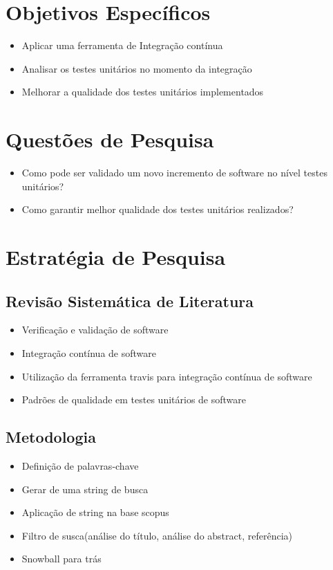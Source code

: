 \section{Objetivos Específicos }
\begin{itemize}
    \item Aplicar uma ferramenta de Integração contínua
    \item Analisar os testes unitários no momento da integração
    \item Melhorar a qualidade dos testes unitários implementados
\end{itemize}
\section{Questões de Pesquisa}
\begin{itemize}
    \item Como pode ser validado um novo incremento de software no nível testes unitários?
    \item Como garantir melhor qualidade dos testes unitários realizados?
\end{itemize}
\section{Estratégia de Pesquisa}
\subsection{Revisão Sistemática de Literatura}
\begin{itemize}
    \item Verificação e validação de software
    \item Integração contínua de software
    \item  Utilização da ferramenta travis para integração contínua de software
    \item Padrões de qualidade em testes unitários de software
\end{itemize}

\subsection{Metodologia}
\begin{itemize}
    \item Definição de palavras-chave
    \item Gerar de uma string de busca
    \item Aplicação de string na base scopus
    \item Filtro de susca(análise do título, análise do abstract, referência)
    \item Snowball para trás
\end{itemize}

